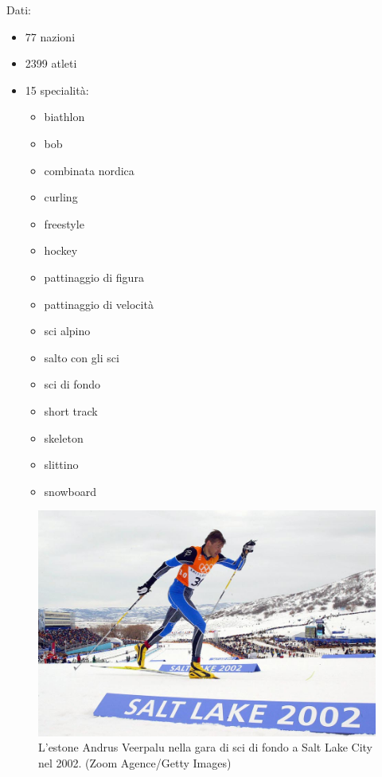 \documentclass[
]{book}
\providecommand{\tightlist}{%
  \setlength{\itemsep}{0pt}\setlength{\parskip}{0pt}}
\begin{document}
Dati:

\begin{itemize}
\tightlist
\item
  77 nazioni
\item
  2399 atleti
\item
  15 specialità:

  \begin{itemize}
  \tightlist
  \item
    biathlon
  \item
    bob
  \item
    combinata nordica
  \item
    curling
  \item
    freestyle
  \item
    hockey
  \item
    pattinaggio di figura
  \item
    pattinaggio di velocità
  \item
    sci alpino
  \item
    salto con gli sci
  \item
    sci di fondo
  \item
    short track
  \item
    skeleton
  \item
    slittino
  \item
    snowboard
  \end{itemize}
\end{itemize}

\begin{figure}
\includegraphics[width=0.8\linewidth]{images/IlPost/2002} \caption{L'estone Andrus Veerpalu nella gara di sci di fondo a Salt Lake City nel 2002. (Zoom Agence/Getty Images)}\label{fig:unnamed-chunk-68}
\end{figure}
\end{document}
